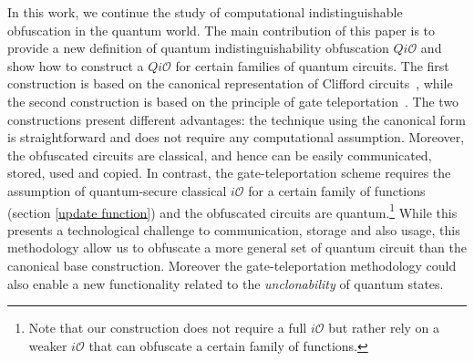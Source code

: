 In this work, we continue the study of computational indistinguishable obfuscation in the quantum world. The main contribution of this paper is to provide a new definition of quantum indistinguishability obfuscation $Qi\mathcal{O}$ and show how to construct a $Qi\mathcal{O}$ for certain families of quantum circuits. The first construction is based on the canonical representation of Clifford circuits~\cite{AG04}, while the second construction is based on the principle of gate teleportation~\cite{GC99}. The two constructions present different advantages: the technique using the canonical form is straightforward and does not require any computational assumption. Moreover, the obfuscated circuits are classical, and hence can be easily communicated, stored, used and copied.  In contrast, the gate-teleportation scheme requires the assumption of quantum-secure classical $i\mathcal{O}$ for a certain family of functions (section \ref{update function}) and the obfuscated circuits are quantum.\footnote{Note that our construction does not require a full $i\mathcal{O}$ but rather rely on a weaker $i\mathcal{O}$ that can obfuscate a certain family of functions.} While this presents a technological challenge to communication, storage and also usage, this methodology allow us to obfuscate a more general set of quantum circuit than the canonical base construction. Moreover the gate-teleportation methodology could also enable a new functionality related to the \emph{unclonability} of quantum states.

